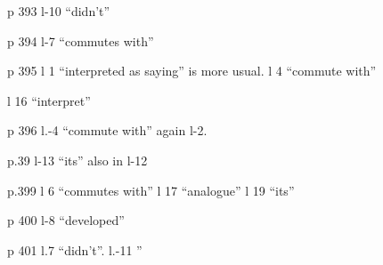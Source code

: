 p 393 l-10 ``didn't''

p 394 l-7 ``commutes with'' 

p 395 l 1 ``interpreted as saying'' is more usual. \quad l 4 ``commute with''

l 16 ``interpret''

p 396 l.-4 ``commute with'' again l-2. 

p.39 l-13 ``its'' also in l-12

p.399 l 6 ``commutes with'' \quad l 17 ``analogue'' \quad l 19 ``its''

p 400 l-8 ``developed''

p 401 l.7 ``didn't''. \quad l.-11 ''
